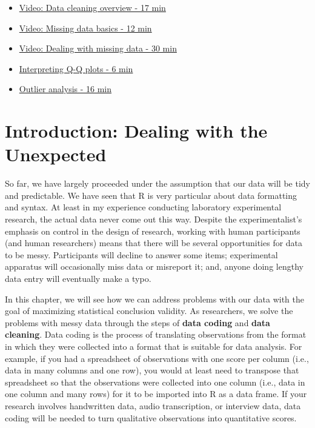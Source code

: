 \documentclass[
]{book}
\begin{document}
\begin{itemize}
\item
  \href{https://youtu.be/uuqcjQPEcuY}{Video: Data cleaning overview - 17 min}
\item
  \href{https://youtu.be/aGRqG1-QGno}{Video: Missing data basics - 12 min}
\item
  \href{https://youtu.be/nDNuk2iag_o}{Video: Dealing with missing data - 30 min}
\item
  \href{https://youtu.be/08fjgHMyNYg}{Interpreting Q-Q plots - 6 min}
\item
  \href{https://youtu.be/gWEczYFK1gY}{Outlier analysis - 16 min}
\end{itemize}

\hypertarget{introduction-dealing-with-the-unexpected}{%
\section{Introduction: Dealing with the Unexpected}\label{introduction-dealing-with-the-unexpected}}

So far, we have largely proceeded under the assumption that our data will be tidy and predictable. We have seen that R is very particular about data formatting and syntax. At least in my experience conducting laboratory experimental research, the actual data never come out this way. Despite the experimentalist's emphasis on control in the design of research, working with human participants (and human researchers) means that there will be several opportunities for data to be messy. Participants will decline to answer some items; experimental apparatus will occasionally miss data or misreport it; and, anyone doing lengthy data entry will eventually make a typo.

In this chapter, we will see how we can address problems with our data with the goal of maximizing statistical conclusion validity. As researchers, we solve the problems with messy data through the steps of \textbf{data coding} and \textbf{data cleaning}. Data coding is the process of translating observations from the format in which they were collected into a format that is suitable for data analysis. For example, if you had a spreadsheet of observations with one score per column (i.e., data in many columns and one row), you would at least need to transpose that spreadsheet so that the observations were collected into one column (i.e., data in one column and many rows) for it to be imported into R as a data frame. If your research involves handwritten data, audio transcription, or interview data, data coding will be needed to turn qualitative observations into quantitative scores.
\end{document}
